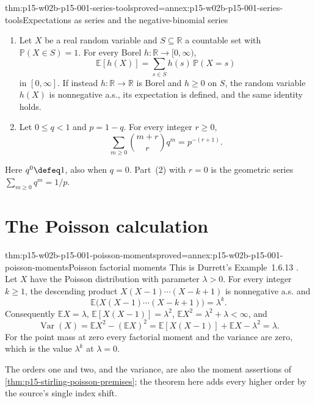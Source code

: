 \begin{hblemma}{thm:p15-w02b-p15-001-series-tools}{proved=annex:p15-w02b-p15-001-series-tools}{Expectations as series and the negative-binomial series}
\par\nobreak
\begin{enumerate}
\item Let \(X\) be a real random variable and \(S\subseteq\mathbb R\)
      a countable set with \(\mathbb P(X\in S)=1\). For every Borel
      \(h:\mathbb R\to[0,\infty)\),
      \[
       \mathbb E[h(X)]=\sum_{s\in S}h(s)\,\mathbb P(X=s)
      \]
      in \([0,\infty]\). If instead \(h:\mathbb R\to\mathbb R\) is
      Borel and \(h\geq0\) on \(S\), the random
      variable \(h(X)\) is nonnegative a.s., its expectation is defined,
      and the same identity holds.
\item Let \(0\leq q<1\) and \(p=1-q\). For every integer \(r\geq0\),
      \[
       \sum_{m\geq0}\binom{m+r}{r}q^m=p^{-(r+1)}.
      \]
\end{enumerate}
Here \(q^0\defeq1\), also when \(q=0\).
Part~(2) with \(r=0\) is the geometric series
\(\sum_{m\geq0}q^m=1/p\).
\end{hblemma}

\section{The Poisson calculation}
\label{sec:p15-w02b-p15-001-poisson}

\begin{hbtheorem}{thm:p15-w02b-p15-001-poisson-moments}{proved=annex:p15-w02b-p15-001-poisson-moments}{Poisson factorial moments}
This is Durrett's Example~1.6.13 \cite[p.~34]{DurrettPTEAuthor2019}.
Let \(X\) have the Poisson distribution with parameter \(\lambda>0\).
For every integer \(k\geq1\), the descending product
\(X(X-1)\cdots(X-k+1)\) is nonnegative a.s. and
\[
 \mathbb E\bigl(X(X-1)\cdots(X-k+1)\bigr)=\lambda^k.
\]
Consequently \(\mathbb EX=\lambda\), \(\mathbb E[X(X-1)]=\lambda^2\),
\(\mathbb EX^2=\lambda^2+\lambda<\infty\), and
\[
 \operatorname{Var}(X)=\mathbb EX^2-(\mathbb EX)^2
   =\mathbb E[X(X-1)]+\mathbb EX-\lambda^2=\lambda.
\]
For the point mass at zero every factorial moment and the variance are
zero, which is the value \(\lambda^k\) at \(\lambda=0\).
\end{hbtheorem}

The orders one and two, and the variance, are also the moment assertions
of \cref{thm:p15-stirling-poisson-premises}; the theorem here adds every
higher order by the source's single index shift.

